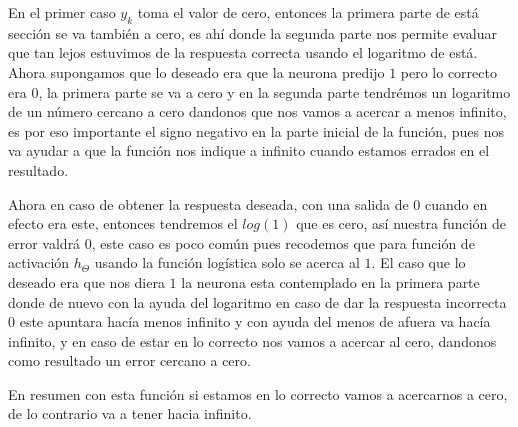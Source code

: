 En el primer caso $y_{k}$ toma el valor de cero, entonces la primera parte de está sección se va también a cero, es ahí donde la segunda parte nos permite evaluar que tan lejos estuvimos de la respuesta correcta usando el logaritmo de está. Ahora supongamos que lo deseado era que la neurona predijo $1$ pero lo correcto era $0$, la primera parte se va a cero y en la segunda parte tendrémos un logaritmo de un número cercano a cero dandonos que nos vamos a acercar a menos infinito, es por eso importante el signo negativo en la parte inicial de la función, pues nos va ayudar a que la función nos indique a infinito cuando estamos errados en el resultado.

Ahora en caso de obtener la respuesta deseada, con una salida de $0$ cuando en efecto era este, entonces tendremos el $log(1)$ que es cero, así nuestra función de error valdrá $0$, este caso es poco común pues recodemos que para función de activación $h_{\Theta}$ usando la función logística solo se acerca al $1$. El caso que lo deseado era que nos diera $1$ la neurona esta contemplado en la primera parte donde de nuevo con la ayuda del logaritmo en caso de dar la respuesta incorrecta $0$ este apuntara hacía menos infinito y con ayuda del menos de afuera va hacía infinito, y en caso de estar en lo correcto nos vamos a acercar al cero, dandonos como resultado un error cercano a cero. 

En resumen con esta función si estamos en lo correcto vamos a acercarnos a cero, de lo contrario va a tener hacia infinito.

